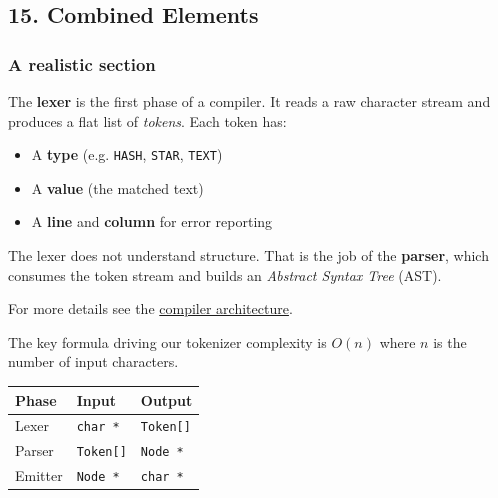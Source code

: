 \documentclass{article}
\begin{document}
\subsection{ 15. Combined Elements}

\subsubsection{ A realistic section}

The \textbf{lexer} is the first phase of a compiler. It reads a raw character stream and produces a flat list of \emph{tokens}. Each token has:

\begin{itemize}
\item  A \textbf{type} (e.g. \texttt{HASH}, \texttt{STAR}, \texttt{TEXT})
\item  A \textbf{value} (the matched text)
\item  A \textbf{line} and \textbf{column} for error reporting
\end{itemize}

The lexer does not understand structure. That is the job of the \textbf{parser}, which consumes the token stream and builds an \emph{Abstract Syntax Tree} (AST).

For more details see the \href{http://example.com/arch}{compiler architecture}.

The key formula driving our tokenizer complexity is $O(n)$ where $n$ is the number of input characters.

\begin{tabular}{lll}
\hline
 Phase    &  Input        &  Output      \\
\hline
 Lexer    &  \texttt{char *}     &  \texttt{Token[]}   \\
 Parser   &  \texttt{Token[]}    &  \texttt{Node *}    \\
 Emitter  &  \texttt{Node *}     &  \texttt{char *}    \\
\hline
\end{tabular}
\end{document}
